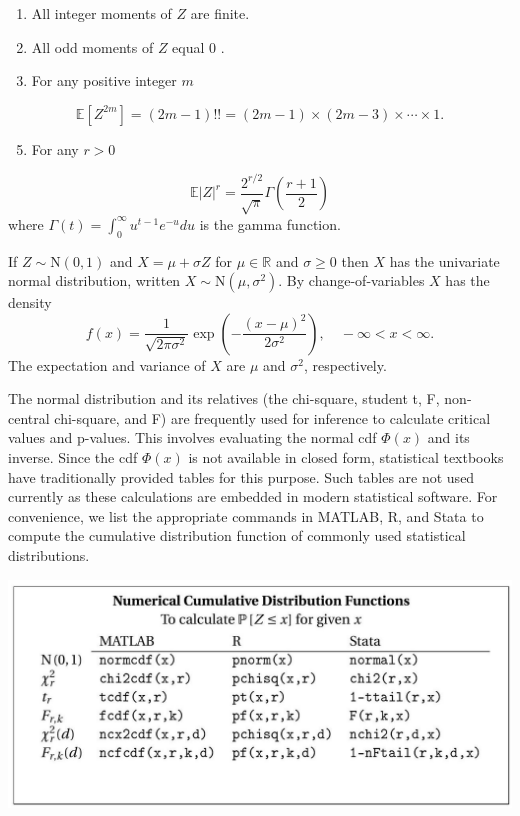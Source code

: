 \documentclass[10pt]{article}
\begin{document}
\begin{enumerate}
  \item All integer moments of $Z$ are finite.

  \item All odd moments of $Z$ equal 0 .

  \item For any positive integer $m$

\end{enumerate}
$$
\mathbb{E}\left[Z^{2 m}\right]=(2 m-1) ! !=(2 m-1) \times(2 m-3) \times \cdots \times 1 .
$$

\begin{enumerate}
  \setcounter{enumi}{4}
  \item For any $r>0$
\end{enumerate}
$$
\mathbb{E}|Z|^{r}=\frac{2^{r / 2}}{\sqrt{\pi}} \Gamma\left(\frac{r+1}{2}\right)
$$
where $\Gamma(t)=\int_{0}^{\infty} u^{t-1} e^{-u} d u$ is the gamma function.

If $Z \sim \mathrm{N}(0,1)$ and $X=\mu+\sigma Z$ for $\mu \in \mathbb{R}$ and $\sigma \geq 0$ then $X$ has the univariate normal distribution, written $X \sim \mathrm{N}\left(\mu, \sigma^{2}\right)$. By change-of-variables $X$ has the density
$$
f(x)=\frac{1}{\sqrt{2 \pi \sigma^{2}}} \exp \left(-\frac{(x-\mu)^{2}}{2 \sigma^{2}}\right), \quad-\infty<x<\infty .
$$
The expectation and variance of $X$ are $\mu$ and $\sigma^{2}$, respectively.

The normal distribution and its relatives (the chi-square, student t, F, non-central chi-square, and F) are frequently used for inference to calculate critical values and $\mathrm{p}$-values. This involves evaluating the normal cdf $\Phi(x)$ and its inverse. Since the cdf $\Phi(x)$ is not available in closed form, statistical textbooks have traditionally provided tables for this purpose. Such tables are not used currently as these calculations are embedded in modern statistical software. For convenience, we list the appropriate commands in MATLAB, R, and Stata to compute the cumulative distribution function of commonly used statistical distributions.

\includegraphics[max width=\textwidth]{2022_09_17_d221298fd653b1ce6adbg-03}
\end{document}
